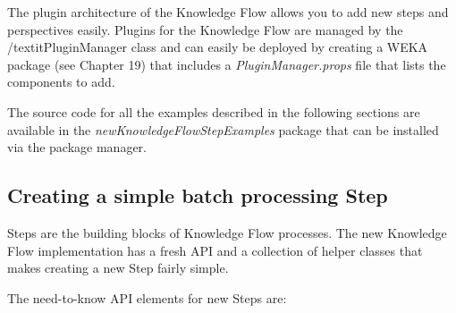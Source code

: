 %
%
%
%


The plugin architecture of the Knowledge Flow allows you to add new steps
and perspectives easily. Plugins for the Knowledge Flow are managed by the
/textit{PluginManager} class and can easily be deployed by creating a 
WEKA package (see Chapter 19) that includes a \textit{PluginManager.props}
file that lists the components to add.

The source code for all the examples described in the following
sections are available in the \textit{newKnowledgeFlowStepExamples}
package that can be installed via the package manager.

\subsection{Creating a simple batch processing Step}
Steps are the building blocks of Knowledge Flow processes. The new
Knowledge Flow implementation has a fresh API and a collection of
helper classes that makes creating a new Step fairly simple.

The need-to-know API elements for new Steps are:

